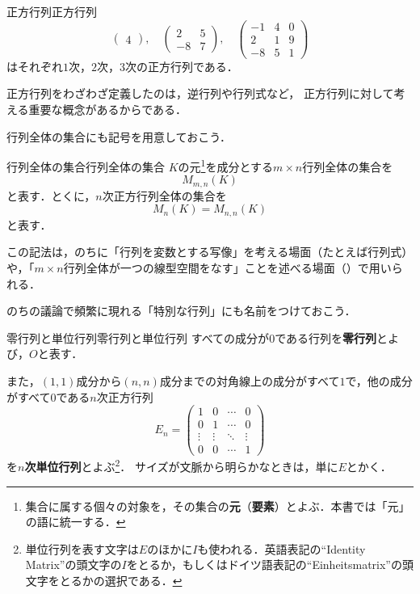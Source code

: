 \begin{example}{正方行列}{正方行列}
  \[
    \begin{pmatrix} 4 \end{pmatrix}, \quad
    \begin{pmatrix} 2 & 5 \\ -8 & 7 \end{pmatrix}, \quad
    \begin{pmatrix} -1 & 4 & 0 \\ 2 & 1 & 9 \\ -8 & 5 & 1 \end{pmatrix}
  \]
  はそれぞれ$1$次，$2$次，$3$次の正方行列である．
\end{example}

正方行列をわざわざ定義したのは，逆行列や行列式など，
正方行列に対して考える重要な概念があるからである．

行列全体の集合にも記号を用意しておこう．

\begin{definition}{行列全体の集合}{行列全体の集合}
  $K$の元\footnote{集合に属する個々の対象を，その集合の\textbf{元}（\textbf{要素}）とよぶ．本書では「元」の語に統一する．}を成分とする$m \times n$行列全体の集合を
  \[
    M_{m,n}(K)
  \]
  と表す．とくに，$n$次正方行列全体の集合を
  \[
    M_n(K) = M_{n,n}(K)
  \]
  と表す．
\end{definition}

この記法は，のちに「行列を変数とする写像」を考える場面（たとえば行列式）や，「$m \times n$行列全体が一つの線型空間をなす」ことを述べる場面（）で用いられる．

のちの議論で頻繁に現れる「特別な行列」にも名前をつけておこう．

\begin{definition}{零行列と単位行列}{零行列と単位行列}
  すべての成分が$0$である行列を\textbf{零行列}とよび，$O$と表す．

  また，$(1,1)$成分から$(n,n)$成分までの対角線上の成分がすべて$1$で，他の成分がすべて$0$である$n$次正方行列
  \[
    E_n =
    \begin{pmatrix}
      1 & 0 & \cdots & 0 \\
      0 & 1 & \cdots & 0 \\
      \vdots & \vdots & \ddots & \vdots \\
      0 & 0 & \cdots & 1
    \end{pmatrix}
  \]
  を\textbf{$n$次単位行列}とよぶ\footnote{単位行列を表す文字は$E$のほかに$I$も使われる．英語表記の``Identity Matrix''の頭文字の$I$をとるか，もしくはドイツ語表記の``Einheitsmatrix''の頭文字をとるかの選択である．}．
  サイズが文脈から明らかなときは，単に$E$とかく．
\end{definition}

